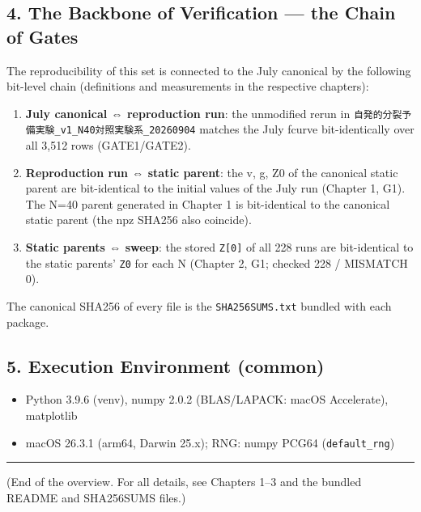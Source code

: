 \documentclass[
  a4paper,
]{ltjsarticle}
\providecommand{\tightlist}{%
  \setlength{\itemsep}{0pt}\setlength{\parskip}{0pt}}
\begin{document}
\subsection{4. The Backbone of Verification --- the Chain of
Gates}\label{the-backbone-of-verification-the-chain-of-gates}

The reproducibility of this set is connected to the July canonical by
the following bit-level chain (definitions and measurements in the
respective chapters):

\begin{enumerate}
\def\labelenumi{\arabic{enumi}.}
\tightlist
\item
  \textbf{July canonical ⇔ reproduction run}: the unmodified rerun in
  \texttt{自発的分裂予備実験\_v1\_N40対照実験系\_20260904} matches the
  July fcurve bit-identically over all 3,512 rows (GATE1/GATE2).
\item
  \textbf{Reproduction run ⇔ static parent}: the v, g, Z0 of the
  canonical static parent are bit-identical to the initial values of the
  July run (Chapter 1, G1). The N=40 parent generated in Chapter 1 is
  bit-identical to the canonical static parent (the npz SHA256 also
  coincide).
\item
  \textbf{Static parents ⇔ sweep}: the stored \texttt{Z{[}0{]}} of all
  228 runs are bit-identical to the static parents' \texttt{Z0} for each
  N (Chapter 2, G1; checked 228 / MISMATCH 0).
\end{enumerate}

The canonical SHA256 of every file is the \texttt{SHA256SUMS.txt}
bundled with each package.

\subsection{5. Execution Environment
(common)}\label{execution-environment-common}

\begin{itemize}
\tightlist
\item
  Python 3.9.6 (venv), numpy 2.0.2 (BLAS/LAPACK: macOS Accelerate),
  matplotlib
\item
  macOS 26.3.1 (arm64, Darwin 25.x); RNG: numpy PCG64
  (\texttt{default\_rng})
\end{itemize}

\begin{center}\rule{0.5\linewidth}{0.5pt}\end{center}

(End of the overview. For all details, see Chapters 1--3 and the bundled
README and SHA256SUMS files.)
\end{document}
